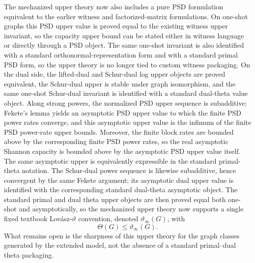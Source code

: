 The mechanized upper theory now also includes a pure PSD formulation equivalent to the earlier witness and factorized-matrix formulations. On one-shot graphs this PSD upper value is proved equal to the existing witness upper invariant, so the capacity upper bound can be stated either in witness language or directly through a PSD object. The same one-shot invariant is also identified with a standard orthonormal-representation form and with a standard primal PSD form, so the upper theory is no longer tied to custom witness packaging. On the dual side, the lifted-dual and Schur-dual log upper objects are proved equivalent, the Schur-dual upper is stable under graph isomorphism, and the same one-shot Schur-dual invariant is identified with a standard dual-theta value object. Along strong powers, the normalized PSD upper sequence is subadditive; Fekete's lemma yields an asymptotic PSD upper value to which the finite PSD power rates converge, and this asymptotic upper value is the infimum of the finite PSD power-rate upper bounds. Moreover, the finite block rates are bounded above by the corresponding finite PSD power rates, so the real asymptotic Shannon capacity is bounded above by the asymptotic PSD upper value itself. The same asymptotic upper is equivalently expressible in the standard primal-theta notation. The Schur-dual power sequence is likewise subadditive, hence convergent by the same Fekete argument; its asymptotic dual upper value is identified with the corresponding standard dual-theta asymptotic object. The standard primal and dual theta upper objects are then proved equal both one-shot and asymptotically, so the mechanized upper theory now supports a single fixed textbook Lov\'asz-$\vartheta$ convention, denoted $\vartheta_{\infty}(G)$, with
\[
\Theta(G)\le \vartheta_{\infty}(G).
\]
 What remains open is the sharpness of this upper theory for the graph classes generated by the extended model, not the absence of a standard primal--dual theta packaging.

